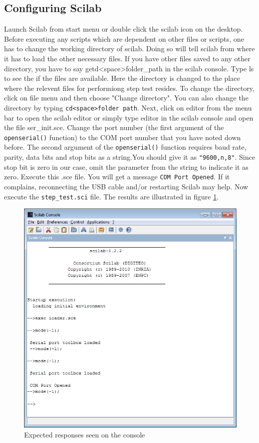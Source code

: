 \subsection{Configuring Scilab}
\label{scilab_sbhs}
Launch Scilab from start menu or double click the scilab icon on the desktop. Before executing any scripts which are dependent on other files or scripts, one has to change the working directory of scilab. Doing so will tell scilab from where it has to load the other necessary files. If you have other files saved to any other directory, you have to say {\ttfamily  getd<space>folder\_path} in the scilab console. Type {\ttfamily ls} to see the if the files are available. Here the directory is changed to the place where the relevent files for performiong step test resides. To change the directory, click on file menu and then choose "Change directory". You can also change the directory by typing {\tt cd<space>folder path}. Next, click on {\ttfamily editor} from the menu bar to open the scilab editor or simply type {\ttfamily editor} in the scilab console and open the file {\ttfamily ser\_init.sce}. Change the port number (the first argument of the {\tt openserial()} function) to the COM port number that you have noted down before. The second argument of the {\tt openserial()} function requires baud rate, parity, data bits and stop bits as a string.You should give it as {\tt "9600,n,8"}. Since stop bit is zero in our case, omit the parameter from the string to indicate it as zero. Execute this .sce file. You will get a message {\tt COM Port Opened}. If it complains, reconnecting the USB cable and/or restarting Scilab may help. Now execute the {\tt step\_test.sci} file.  The results are illustrated in figure \ref{loader}. 

\begin{figure}
\centering
\includegraphics[width=0.7\linewidth]{using-sbhs/console.png}
\caption{Expected responses seen on the console}
\label{loader}
\end{figure}


